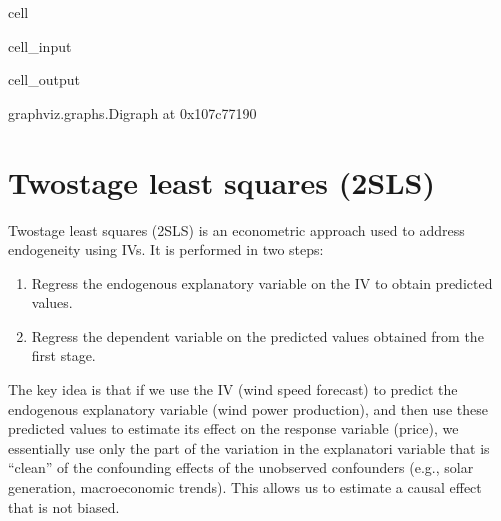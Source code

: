\documentclass[letterpaper,10pt,english]{jupyterBook}
\begin{document}
\begin{sphinxuseclass}{cell}
\begin{sphinxVerbatimInput}
\begin{sphinxuseclass}{cell_input}
\begin{sphinxVerbatim}[commandchars=\\\{\}]
\end{sphinxVerbatim}

\end{sphinxuseclass}\end{sphinxVerbatimInput}
\begin{sphinxVerbatimOutput}

\begin{sphinxuseclass}{cell_output}
\begin{sphinxVerbatim}[commandchars=\\\{\}]
\PYGZlt{}graphviz.graphs.Digraph at 0x107c77190\PYGZgt{}
\end{sphinxVerbatim}

\end{sphinxuseclass}\end{sphinxVerbatimOutput}

\end{sphinxuseclass}

\section{Two\sphinxhyphen{}stage least squares (2SLS)}
\label{\detokenize{notebooks/instrumental_variables:two-stage-least-squares-2sls}}
\sphinxAtStartPar
Two\sphinxhyphen{}stage least squares (2SLS) is an econometric approach used to address endogeneity using IVs. It is performed in two steps:
\begin{enumerate}
%
\item {} 
\sphinxAtStartPar
Regress the endogenous explanatory variable on the IV to obtain predicted values.

\item {} 
\sphinxAtStartPar
Regress the dependent variable on the predicted values obtained from the first stage.

\end{enumerate}

\sphinxAtStartPar
The key idea is that if we use the IV (wind speed forecast) to predict the endogenous explanatory variable (wind power production), and then use these predicted values to estimate its effect on the response variable (price), we essentially use only the part of the variation in the explanatori variable that is “clean” of the confounding effects of the unobserved confounders (e.g., solar generation, macroeconomic trends). This allows us to estimate a causal effect that is not biased.
\end{document}
